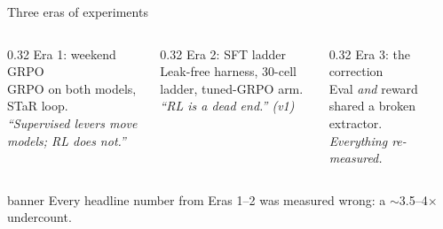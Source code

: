 \documentclass[aspectratio=169,10pt]{beamer}
\newcommand{\term}[1]{\textcolor{jasecidark}{#1}}
\begin{document}
\begin{frame}{Three eras of experiments}
  \small
  \begin{columns}[T]
    \begin{column}{0.32\textwidth}
      \term{Era 1: weekend GRPO}\\[2mm]
      GRPO on both models, STaR loop.\\[2mm]
      \emph{``Supervised levers move models; RL does not.''}
    \end{column}
    \begin{column}{0.32\textwidth}
      \term{Era 2: SFT ladder}\\[2mm]
      Leak-free harness, 30-cell ladder, tuned-GRPO arm.\\[2mm]
      \emph{``RL is a dead end.'' (v1)}
    \end{column}
    \begin{column}{0.32\textwidth}
      \term{Era 3: the correction}\\[2mm]
      Eval \emph{and} reward shared a broken extractor.\\[2mm]
      \emph{Everything re-measured.}
    \end{column}
  \end{columns}

  \vspace{6mm}
  \centering
  \begin{beamercolorbox}[rounded=true,sep=1.5mm,wd=0.92\textwidth]{banner}
    \centering Every headline number from Eras 1--2 was measured wrong: a $\sim$3.5--4$\times$ undercount.
  \end{beamercolorbox}
\end{frame}
\end{document}
